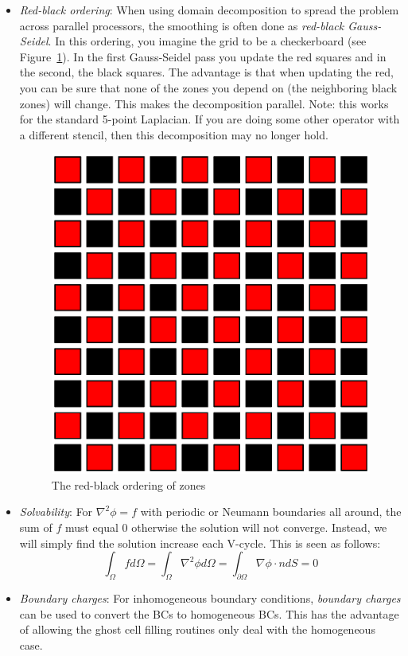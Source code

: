 \begin{itemize}

\item {\em Red-black ordering}: When using domain decomposition to
  spread the problem across parallel processors, the smoothing is
  often done as {\em red-black Gauss-Seidel}.  In this ordering, you
  imagine the grid to be a checkerboard (see Figure~\ref{fig:rb}).  In
  the first Gauss-Seidel pass you update the red squares and in the
  second, the black squares.  The advantage is that when updating the
  red, you can be sure that none of the zones you depend on (the
  neighboring black zones) will change.  This makes the decomposition
  parallel.  Note: this works for the standard 5-point Laplacian.  If
  you are doing some other operator with a different stencil, then
  this decomposition may no longer hold.

  \begin{figure}[t]
    \centering
    \includegraphics[width=0.6\linewidth]{rb}
    \caption{\label{fig:rb} The red-black ordering of zones}
  \end{figure}

\item {\em Solvability}: For $\nabla^2 \phi = f$ with periodic or
  Neumann boundaries all around, the sum of $f$ must equal $0$
  otherwise the solution will not converge.  Instead, we will simply
  find the solution increase each V-cycle.  This is seen as follows:
\begin{equation}
\int_\Omega f d\Omega = \int_\Omega \nabla^2 \phi d\Omega =
\int_{\partial \Omega} \nabla \phi \cdot n dS = 0
\end{equation}

\item {\em Boundary charges}: For inhomogeneous boundary conditions,
{\em boundary charges} can be used to convert the BCs to homogeneous
BCs.  This has the advantage of allowing the ghost cell filling 
routines only deal with the homogeneous case.


\end{itemize}
